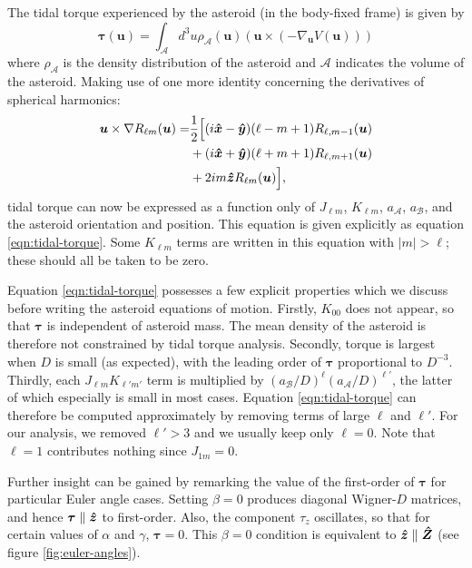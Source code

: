 The tidal torque experienced by the asteroid (in the body-fixed frame) is given by
\begin{equation}
  \bm{\tau}(\bm u) = \int_\mathcal{A} d^3 u \rho_\mathcal{A}(\bm u) (\bm u \times (-\nabla_{\bm u} V(\bm u)))
\end{equation}
where $\rho_\mathcal{A}$ is the density distribution of the asteroid and $\mathcal{A}$ indicates the volume of the asteroid. Making use of one more identity concerning the derivatives of spherical harmonics:
\begin{equation}
  \begin{split}
  \bm u \times \nabla R_{\ell m}(\bm u)=&\frac{1}{2}\Big[(i\bm{\hat{x}} - \bm{\hat{y}})(\ell-m+1)R_{\ell,m-1}(\bm u)\\
  &+(i\bm{\hat{x}}+\bm{\hat{y}})(\ell+m+1)R_{\ell,m+1}(\bm u)\\
  & +2im\bm{\hat{z}} R_{\ell m}(\bm u)\Big],
  \end{split}
\end{equation}
tidal torque can now be expressed as a function only of $J_{\ell m}$, $K_{\ell m}$, $a_\mathcal{A}$, $a_\mathcal{B}$, and the asteroid orientation and position. This equation is given explicitly as equation \ref{eqn:tidal-torque}. Some $K_{\ell m}$ terms are written in this equation with $|m|>\ell$; these should all be taken to be zero.

Equation \ref{eqn:tidal-torque} possesses a few explicit properties which we discuss before writing the asteroid equations of motion. Firstly, $K_{00}$ does not appear, so that $\bm \tau$ is independent of asteroid mass. The mean density of the asteroid is therefore not constrained by tidal torque analysis. Secondly, torque is largest when $D$ is small (as expected), with the leading order of $\bm \tau$ proportional to $D^{-3}$. Thirdly, each $J_{\ell m}K_{\ell' m'}$ term is multiplied by $(a_\mathcal{B}/D)^\ell (a_\mathcal{A}/D)^{\ell'}$, the latter of which especially is small in most cases. Equation \ref{eqn:tidal-torque} can therefore be computed approximately by removing terms of large $\ell$ and $\ell'$. For our analysis, we removed $\ell' > 3$ and we usually keep only $\ell=0$. Note that $\ell=1$ contributes nothing since $J_{1m}=0$.

Further insight can be gained by remarking the value of the first-order of $\bm \tau$ for particular Euler angle cases. Setting $\beta = 0$ produces diagonal Wigner-$D$ matrices, and hence $\bm \tau \parallel \bm{\hat{z}}$ to first-order. Also, the component $\tau_z$ oscillates, so that for certain values of $\alpha$ and $\gamma$, $\bm \tau = 0.$ This $\beta=0$ condition is equivalent to $\bm{\hat{z}} \parallel \bm{\hat{Z}}$ (see figure \ref{fig:euler-angles}).

